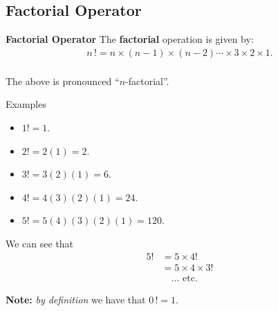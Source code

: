 \documentclass[compress]{beamer}        %
\makeatletter
\newcommand{\tcb}{\textcolor{beamer@blendedblue}}
\makeatother
\begin{document}
\subsection{Factorial Operator}
\begin{frame}{\bf \tcb{Factorial Operator}}
The {\bf factorial} operation is given by:\\
\begin{align*}
\boxed{n\,! = n \times (n - 1) \times (n - 2) \cdots \times 3 \times 2 \times 1}.\\[-0.3cm]
\end{align*}

The above is pronounced ``$n$-factorial''.\\[0.5cm]

\begin{minipage}[t]{0.45\textwidth}
Examples
\begin{itemize}
\item $1! = 1$.
\item $2! = 2(1) = 2$.
\item $3! = 3(2)(1) = 6$.
\item $4! = 4(3)(2)(1) = 24$.
\item $5! = 5(4)(3)(2)(1) = 120$.
\end{itemize}
\end{minipage}\hspace{0.08\textwidth}
\begin{minipage}[t]{0.45\textwidth}
We can see that
\begin{align*}
5! &= 5 \times 4!\\[0.3cm]
&= 5 \times 4 \times 3!\\[0.3cm]
&\quad\ldots \text{ etc}.
\end{align*}
\end{minipage}
\vspace{0.2cm}
\begin{center}
{\bf Note:} \emph{by definition} we have that $\boxed{0\,! = 1}.$
\end{center}

\end{frame}
\end{document}
